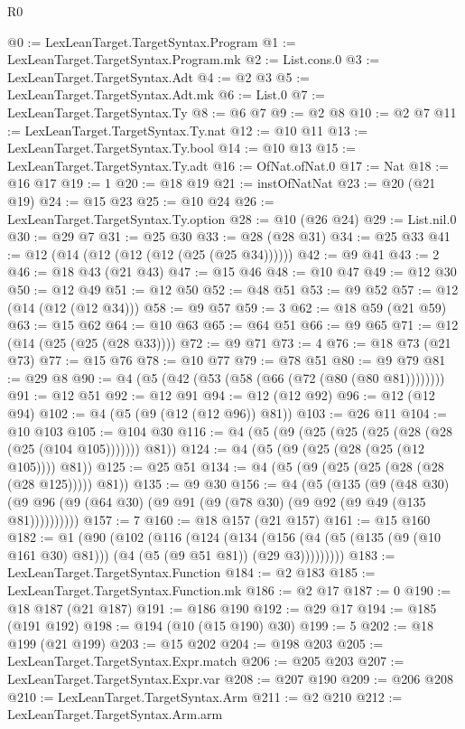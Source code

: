 \begin{lexlean}{R0}
\begin{coremodule}
@0 := LexLeanTarget.TargetSyntax.Program
@1 := LexLeanTarget.TargetSyntax.Program.mk
@2 := List.cons.{0}
@3 := LexLeanTarget.TargetSyntax.Adt
@4 := @2 @3
@5 := LexLeanTarget.TargetSyntax.Adt.mk
@6 := List.{0}
@7 := LexLeanTarget.TargetSyntax.Ty
@8 := @6 @7
@9 := @2 @8
@10 := @2 @7
@11 := LexLeanTarget.TargetSyntax.Ty.nat
@12 := @10 @11
@13 := LexLeanTarget.TargetSyntax.Ty.bool
@14 := @10 @13
@15 := LexLeanTarget.TargetSyntax.Ty.adt
@16 := OfNat.ofNat.{0}
@17 := Nat
@18 := @16 @17
@19 := 1
@20 := @18 @19
@21 := instOfNatNat
@23 := @20 (@21 @19)
@24 := @15 @23
@25 := @10 @24
@26 := LexLeanTarget.TargetSyntax.Ty.option
@28 := @10 (@26 @24)
@29 := List.nil.{0}
@30 := @29 @7
@31 := @25 @30
@33 := @28 (@28 @31)
@34 := @25 @33
@41 := @12 (@14 (@12 (@12 (@12 (@25 (@25 @34))))))
@42 := @9 @41
@43 := 2
@46 := @18 @43 (@21 @43)
@47 := @15 @46
@48 := @10 @47
@49 := @12 @30
@50 := @12 @49
@51 := @12 @50
@52 := @48 @51
@53 := @9 @52
@57 := @12 (@14 (@12 (@12 @34)))
@58 := @9 @57
@59 := 3
@62 := @18 @59 (@21 @59)
@63 := @15 @62
@64 := @10 @63
@65 := @64 @51
@66 := @9 @65
@71 := @12 (@14 (@25 (@25 (@28 @33))))
@72 := @9 @71
@73 := 4
@76 := @18 @73 (@21 @73)
@77 := @15 @76
@78 := @10 @77
@79 := @78 @51
@80 := @9 @79
@81 := @29 @8
@90 := @4 (@5 (@42 (@53 (@58 (@66 (@72 (@80 (@80 @81))))))))
@91 := @12 @51
@92 := @12 @91
@94 := @12 (@12 @92)
@96 := @12 (@12 @94)
@102 := @4 (@5 (@9 (@12 (@12 @96)) @81))
@103 := @26 @11
@104 := @10 @103
@105 := @104 @30
@116 := @4 (@5 (@9 (@25 (@25 (@25 (@28 (@28 (@25 (@104 @105))))))) @81))
@124 := @4 (@5 (@9 (@25 (@28 (@25 (@12 @105)))) @81))
@125 := @25 @51
@134 := @4 (@5 (@9 (@25 (@25 (@28 (@28 (@28 @125))))) @81))
@135 := @9 @30
@156 := @4
    (@5
      (@135
        (@9
          (@48 @30)
          (@9 @96 (@9 (@64 @30) (@9 @91 (@9 (@78 @30) (@9 @92 (@9 @49 (@135 @81))))))))))
@157 := 7
@160 := @18 @157 (@21 @157)
@161 := @15 @160
@182 := @1
    (@90
      (@102
        (@116
          (@124
            (@134
              (@156 (@4 (@5 (@135 (@9 (@10 @161 @30) @81))) (@4 (@5 (@9 @51 @81)) (@29 @3)))))))))
@183 := LexLeanTarget.TargetSyntax.Function
@184 := @2 @183
@185 := LexLeanTarget.TargetSyntax.Function.mk
@186 := @2 @17
@187 := 0
@190 := @18 @187 (@21 @187)
@191 := @186 @190
@192 := @29 @17
@194 := @185 (@191 @192)
@198 := @194 (@10 (@15 @190) @30)
@199 := 5
@202 := @18 @199 (@21 @199)
@203 := @15 @202
@204 := @198 @203
@205 := LexLeanTarget.TargetSyntax.Expr.match
@206 := @205 @203
@207 := LexLeanTarget.TargetSyntax.Expr.var
@208 := @207 @190
@209 := @206 @208
@210 := LexLeanTarget.TargetSyntax.Arm
@211 := @2 @210
@212 := LexLeanTarget.TargetSyntax.Arm.arm

\end{coremodule}
\end{lexlean}

